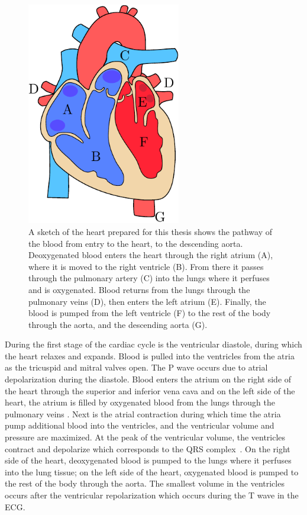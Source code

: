 \begin{figure}[H]
    \centering
    \includegraphics[width=0.6\textwidth]{chapter2-background/imgs/heart_drawing.pdf}
    \caption[Sketch of the anatomical heart]{A sketch of the heart prepared for this thesis
    shows the pathway of the blood
    from entry to the heart, to the descending aorta. 
    Deoxygenated blood enters the heart through the right atrium
    (A), where it is moved to the right ventricle (B). From there it passes through 
    the pulmonary artery (C) into the lungs where it perfuses and is oxygenated. 
    Blood returns from the lungs through the pulmonary veins (D), then enters 
    the left atrium (E). Finally, the blood is pumped from the left
    ventricle (F) to the rest of the body through the aorta, and the
    descending aorta (G).}
    \label{fig:anatomical_heart}
\end{figure}

During the first stage of the cardiac cycle is the ventricular
diastole, during which the heart relaxes and 
expands. Blood is pulled into the ventricles 
from the atria as the tricuspid and mitral valves open.
The P wave occurs due to atrial depolarization during the diastole.
Blood enters the atrium 
on the right side of the heart through the
superior and inferior vena cava and on the left side of the heart, the atrium is 
filled by oxygenated blood from the lungs through the pulmonary 
veins \parencite{pappano_cardiovascular_2019}.
Next is the atrial contraction during which time the atria pump additional
blood into the ventricles, and the ventricular volume and pressure 
are maximized. At the peak of the ventricular volume, the ventricles contract 
and depolarize which corresponds to the QRS complex~\parencite{pollock_physiology_2021}. 
On the right side of the heart, deoxygenated blood is pumped 
to the lungs where it perfuses into the lung tissue; on the left side of 
the heart, oxygenated blood is pumped to the rest of the body through the 
aorta. The smallest volume in the ventricles occurs after 
the ventricular repolarization which occurs during the T wave in the ECG.

